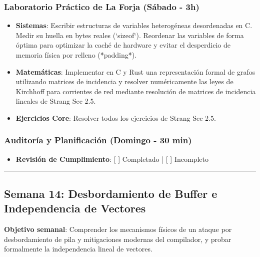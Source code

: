 \documentclass[11pt, a4paper]{article}
\begin{document}
\subsubsection{Laboratorio Práctico de La Forja (Sábado - 3h)}
\begin{itemize}
    \item \textbf{Sistemas}: Escribir estructuras de variables heterogéneas desordenadas en C. Medir su huella en bytes reales (`sizeof`). Reordenar las variables de forma óptima para optimizar la caché de hardware y evitar el desperdicio de memoria física por relleno (*padding*).
    \item \textbf{Matemáticas}: Implementar en C y Rust una representación formal de grafos utilizando matrices de incidencia y resolver numéricamente las leyes de Kirchhoff para corrientes de red mediante resolución de matrices de incidencia lineales de Strang Sec 2.5.
    \item \textbf{Ejercicios Core}: Resolver todos los ejercicios de Strang Sec 2.5.
\end{itemize}

\subsubsection{Auditoría y Planificación (Domingo - 30 min)}
\begin{itemize}
    \item \textbf{Revisión de Cumplimiento}: [ ] Completado | [ ] Incompleto
\end{itemize}

\noindent\rule{\textwidth}{0.4pt}

\subsection{Semana 14: Desbordamiento de Buffer e Independencia de Vectores}
\textbf{Objetivo semanal}: Comprender los mecanismos físicos de un ataque por desbordamiento de pila y mitigaciones modernas del compilador, y probar formalmente la independencia lineal de vectores.
\end{document}
